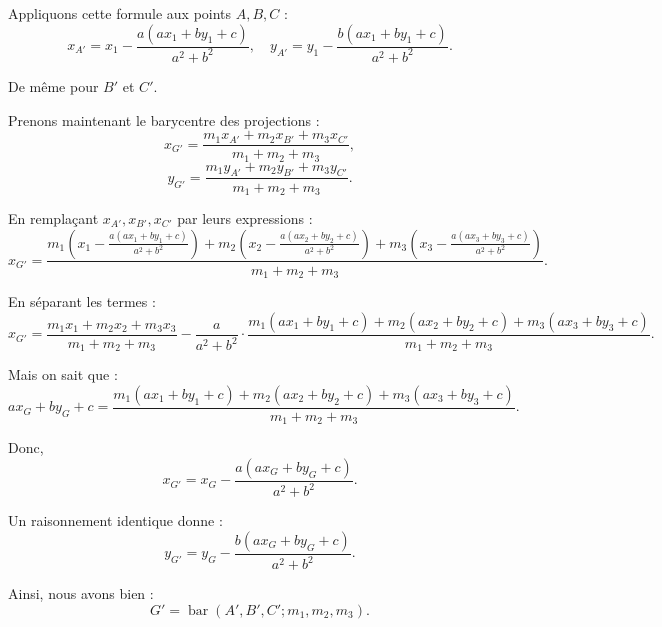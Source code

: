 \documentclass[10pt,a4paper]{article}
\begin{document}
Appliquons cette formule aux points \( A, B, C \) :
\[
x_{A'} = x_1 - \frac{a(ax_1 + by_1 + c)}{a^2 + b^2}, \quad
y_{A'} = y_1 - \frac{b(ax_1 + by_1 + c)}{a^2 + b^2}.
\]

De même pour \( B' \) et \( C' \).

Prenons maintenant le barycentre des projections :
\[
x_{G'} = \frac{m_1 x_{A'} + m_2 x_{B'} + m_3 x_{C'}}{m_1 + m_2 + m_3},
\]
\[
y_{G'} = \frac{m_1 y_{A'} + m_2 y_{B'} + m_3 y_{C'}}{m_1 + m_2 + m_3}.
\]

En remplaçant \( x_{A'}, x_{B'}, x_{C'} \) par leurs expressions :
\[
x_{G'} = \frac{m_1 \left( x_1 - \frac{a(ax_1 + by_1 + c)}{a^2 + b^2} \right)
+ m_2 \left( x_2 - \frac{a(ax_2 + by_2 + c)}{a^2 + b^2} \right)
+ m_3 \left( x_3 - \frac{a(ax_3 + by_3 + c)}{a^2 + b^2} \right) }
{m_1 + m_2 + m_3}.
\]

En séparant les termes :
\[
x_{G'} = \frac{m_1 x_1 + m_2 x_2 + m_3 x_3}{m_1 + m_2 + m_3}
- \frac{a}{a^2 + b^2} \cdot \frac{m_1 (ax_1 + by_1 + c) + m_2 (ax_2 + by_2 + c) + m_3 (ax_3 + by_3 + c)}{m_1 + m_2 + m_3}.
\]

Mais on sait que :
\[
ax_G + by_G + c = \frac{m_1 (ax_1 + by_1 + c) + m_2 (ax_2 + by_2 + c) + m_3 (ax_3 + by_3 + c)}{m_1 + m_2 + m_3}.
\]

Donc,
\[
x_{G'} = x_G - \frac{a(ax_G + by_G + c)}{a^2 + b^2}.
\]

Un raisonnement identique donne :
\[
y_{G'} = y_G - \frac{b(ax_G + by_G + c)}{a^2 + b^2}.
\]

Ainsi, nous avons bien :
\[
G' = \operatorname{bar}(A', B', C'; m_1, m_2, m_3).
\]
\end{document}
